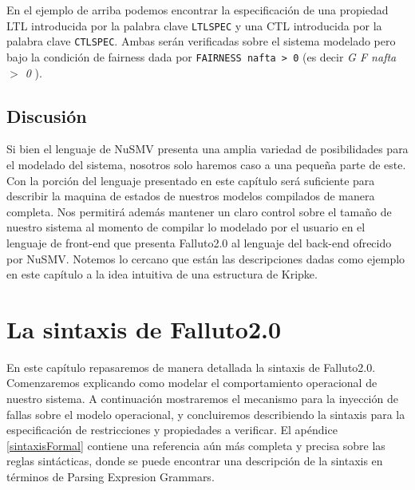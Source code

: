 \documentclass[pdftex,a4paper,12pt]{book}
\begin{document}
En el ejemplo de arriba podemos encontrar la especificaci\'on de una propiedad LTL introducida por la palabra clave \texttt{LTLSPEC} y una CTL introducida por la palabra clave \texttt{CTLSPEC}. Ambas ser\'an verificadas sobre el sistema modelado pero bajo la condici\'on de fairness dada por \texttt{FAIRNESS nafta >~0} (es decir \textit{G F nafta $>$ 0} ).

\section*{Discusi\'on}

Si bien el lenguaje de NuSMV presenta una amplia variedad de posibilidades para el modelado del sistema, nosotros solo haremos caso a una peque\~na parte de este. Con la porci\'on del lenguaje presentado en este cap\'itulo ser\'a suficiente para describir la maquina de estados de nuestros modelos compilados de manera completa. Nos permitir\'a adem\'as mantener un claro control sobre el tama\~no de nuestro sistema al momento de compilar lo modelado por el usuario en el lenguaje de front-end que presenta Falluto2.0 al lenguaje del back-end ofrecido por NuSMV. Notemos lo cercano que est\'an las descripciones dadas como ejemplo en este cap\'itulo a la idea intuitiva de una estructura de Kripke.



\chapter{La sintaxis de Falluto2.0}
\label{sintaxisDeFalluto}

En este cap\'itulo repasaremos de manera detallada la sintaxis de Falluto2.0. Comenzaremos explicando como modelar el comportamiento operacional de nuestro sistema. A continuaci\'on mostraremos el mecanismo para la inyecci\'on de fallas sobre el modelo operacional, y concluiremos describiendo la sintaxis para la especificaci\'on de restricciones y propiedades a verificar. El ap\'endice \ref{sintaxisFormal} contiene una referencia a\'un m\'as completa y precisa sobre las reglas sint\'acticas, donde se puede encontrar una descripci\'on de la sintaxis en t\'erminos de Parsing Expresion Grammars.
\end{document}
